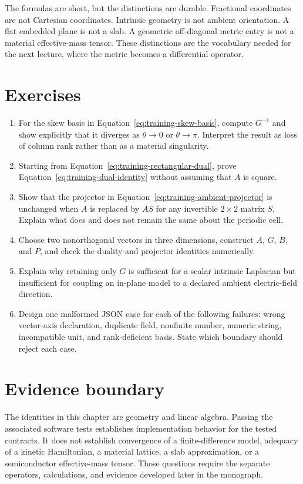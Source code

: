 The formulas are short, but the distinctions are durable. Fractional
coordinates are not Cartesian coordinates. Intrinsic geometry is not ambient
orientation. A flat embedded plane is not a slab. A geometric off-diagonal
metric entry is not a material effective-mass tensor. These distinctions are
the vocabulary needed for the next lecture, where the metric becomes a
differential operator.

\section{Exercises}

\begin{enumerate}
  \item For the skew basis in Equation~\eqref{eq:training-skew-basis}, compute
        $G^{-1}$ and show explicitly that it diverges as
        $\theta\rightarrow0$ or $\theta\rightarrow\pi$. Interpret the result as
        loss of column rank rather than as a material singularity.
  \item Starting from Equation~\eqref{eq:training-rectangular-dual}, prove
        Equation~\eqref{eq:training-dual-identity} without assuming that $A$ is
        square.
  \item Show that the projector in
        Equation~\eqref{eq:training-ambient-projector} is unchanged when $A$ is
        replaced by $AS$ for any invertible $2\times2$ matrix $S$. Explain what
        does and does not remain the same about the periodic cell.
  \item Choose two nonorthogonal vectors in three dimensions, construct $A$,
        $G$, $B$, and $P$, and check the duality and projector identities
        numerically.
  \item Explain why retaining only $G$ is sufficient for a scalar intrinsic
        Laplacian but insufficient for coupling an in-plane model to a declared
        ambient electric-field direction.
  \item Design one malformed JSON case for each of the following failures:
        wrong vector-axis declaration, duplicate field, nonfinite number,
        numeric string, incompatible unit, and rank-deficient basis. State
        which boundary should reject each case.
\end{enumerate}

\section{Evidence boundary}

The identities in this chapter are geometry and linear algebra. Passing the
associated software tests establishes implementation behavior for the tested
contracts. It does not establish convergence of a finite-difference model,
adequacy of a kinetic Hamiltonian, a material lattice, a slab approximation,
or a semiconductor effective-mass tensor. Those questions require the
separate operators, calculations, and evidence developed later in the
monograph.
